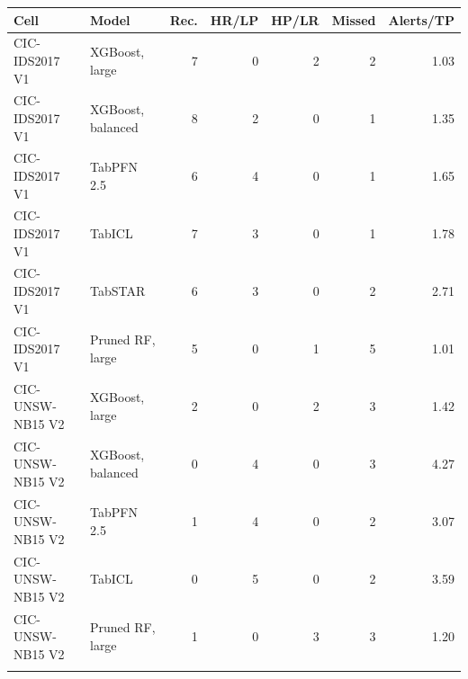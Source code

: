 \begin{tabular}{@{}llrrrrr@{}}
\toprule
Cell & Model & Rec. & HR/LP & HP/LR & Missed & Alerts/TP \\
\midrule
CIC-IDS2017 V1 & XGBoost, large & 7 & 0 & 2 & 2 & 1.03 \\
CIC-IDS2017 V1 & XGBoost, balanced & 8 & 2 & 0 & 1 & 1.35 \\
CIC-IDS2017 V1 & TabPFN 2.5 & 6 & 4 & 0 & 1 & 1.65 \\
CIC-IDS2017 V1 & TabICL & 7 & 3 & 0 & 1 & 1.78 \\
CIC-IDS2017 V1 & TabSTAR & 6 & 3 & 0 & 2 & 2.71 \\
CIC-IDS2017 V1 & Pruned RF, large & 5 & 0 & 1 & 5 & 1.01 \\
\addlinespace
CIC-UNSW-NB15 V2 & XGBoost, large & 2 & 0 & 2 & 3 & 1.42 \\
CIC-UNSW-NB15 V2 & XGBoost, balanced & 0 & 4 & 0 & 3 & 4.27 \\
CIC-UNSW-NB15 V2 & TabPFN 2.5 & 1 & 4 & 0 & 2 & 3.07 \\
CIC-UNSW-NB15 V2 & TabICL & 0 & 5 & 0 & 2 & 3.59 \\
CIC-UNSW-NB15 V2 & Pruned RF, large & 1 & 0 & 3 & 3 & 1.20 \\
\addlinespace
\bottomrule
\end{tabular}